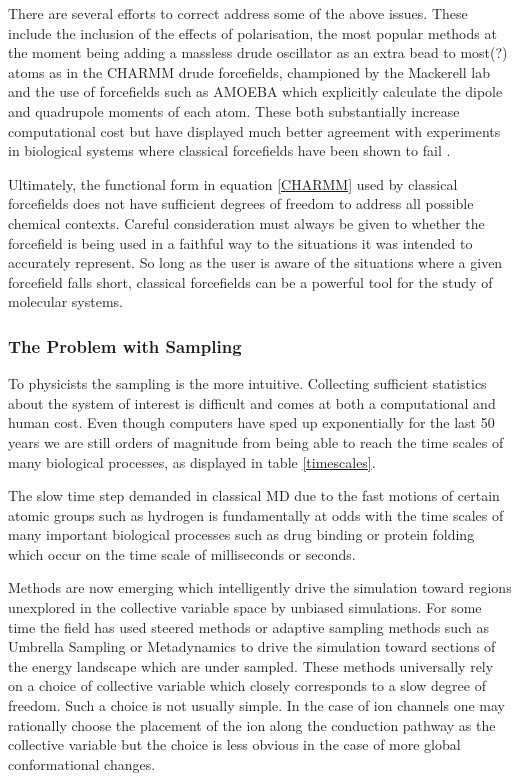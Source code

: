 There are several efforts to correct address some of the above issues. These include the inclusion of the effects of polarisation, the most popular methods at the moment being adding a massless drude oscillator as an extra bead to most(?) atoms as in the CHARMM drude forcefields, championed by the Mackerell lab and the use of forcefields such as AMOEBA which explicitly calculate the dipole and quadrupole moments of each atom. These both substantially increase computational cost but have displayed much better agreement with experiments in biological systems where classical forcefields have been shown to fail \cite{ngo2021}. 

Ultimately, the functional form in equation \ref{CHARMM} used by classical forcefields does not have sufficient degrees of freedom to address all possible chemical contexts. Careful consideration must always be given to whether the forcefield is being used in a faithful way to the situations it was intended to accurately represent. So long as the user is aware of the situations where a given forcefield falls short, classical forcefields can be a powerful tool for the study of molecular systems.

\subsubsection{The Problem with Sampling}

To physicists the sampling is the more intuitive. Collecting sufficient statistics about the system of interest is difficult and comes at both a computational and human cost. Even though computers have sped up exponentially for the last 50 years we are still orders of magnitude from being able to reach the time scales of many biological processes, as displayed in table \ref{timescales}.

The slow time step demanded in classical MD due to the fast motions of certain atomic groups such as hydrogen is fundamentally at odds with the time scales of many important biological processes such as drug binding or protein folding which occur on the time scale of  milliseconds or seconds.  

Methods are now emerging which intelligently drive the simulation toward regions unexplored in the collective variable space by unbiased simulations. For some time the field has used steered methods or adaptive sampling methods such as Umbrella Sampling or Metadynamics to drive the simulation toward sections of the energy landscape which are under sampled. These methods universally rely on a choice of collective variable which closely corresponds to a slow degree of freedom. Such a choice is not usually simple. In the case of ion channels one may rationally choose the placement of the ion along the conduction pathway as the collective variable but the choice is less obvious in the case of more global conformational changes.

